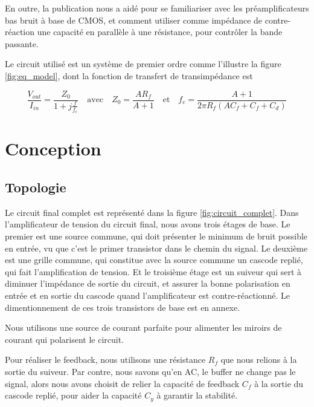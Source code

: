 \documentclass[a4paper,12pt]{article}
\numberwithin{equation}{section}
\renewcommand{\j}{\ensuremath{j}}
\newcommand{\?}{\stackrel{?}{=}}
\begin{document}
En outre, la publication \cite{sansen_1990} nous a aidé pour se familiariser avec les préamplificateurs bas bruit à base de CMOS, et comment utiliser comme impédance de contre-réaction une capacité en parallèle à une résistance, pour contrôler la bande passante.

Le circuit utilisé est un système de premier ordre comme l'illustre la figure \ref{fig:eq_model}, dont la fonction de transfert de transimpédance est

\begin{equation}\label{eq:transfer}
    \frac{V_{out}}{I_{in}}=\frac{Z_{0}}{1+\j\frac{f}{f_{c}}}
    \quad
    \text{avec}
    \quad
    Z_{0}=\frac{AR_{f}}{A + 1}
    \quad
    \text{et}
    \quad
    f_c=\frac{A+1}{2\pi R_f(AC_f+C_f+C_d)}
\end{equation}


\FloatBarrier
\newpage
\section{Conception}\label{sec:conception}

\subsection{Topologie}

Le circuit final complet est représenté dans la figure \ref{fig:circuit_complet}. Dans l'amplificateur de tension du circuit final, nous avons trois étages de base. Le premier est une source commune, qui doit présenter le minimum de bruit possible en entrée, vu que c'est le primer transistor dans le chemin du signal. Le deuxième est une grille commune, qui constitue avec la source commune un cascode replié, qui fait l'amplification de tension. Et le troisième étage est un suiveur qui sert à diminuer l'impédance de sortie du circuit, et assurer la bonne polarisation en entrée et en sortie du cascode quand l'amplificateur est contre-réactionné. Le dimentionnement de ces trois transistors de base est en annexe.

Nous utilisons une source de courant parfaite pour alimenter les miroirs de courant qui polarisent le circuit.

Pour réaliser le feedback, nous utilisons une résistance $R_f$ que nous relions à la sortie du suiveur. Par contre, nous savons qu'en AC, le buffer ne change pas le signal, alors nous avons choisit de relier la capacité de feedback $C_f$ à la sortie du cascode replié, pour aider la capacité $C_y$ à garantir la stabilité.
\end{document}
